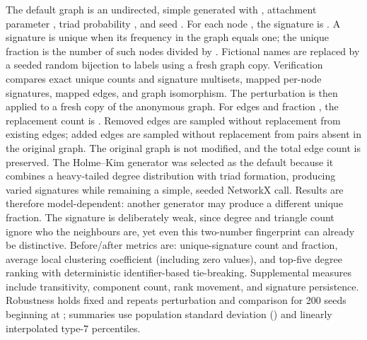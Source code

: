 {}
\markdownRendererSectionEnd \markdownRendererSectionBegin
{}\markdownRendererInterblockSeparator
{}The default graph is an undirected, simple  generated with , attachment parameter , triad probability , and seed . For each node , the signature is . A signature is unique when its frequency in the graph equals one; the unique fraction is the number of such nodes divided by .\markdownRendererParagraphSeparator
{}Fictional names are replaced by a seeded random bijection to  labels using a fresh graph copy. Verification compares exact unique counts and signature multisets, mapped per-node signatures, mapped edges, and graph isomorphism. The perturbation is then applied to a fresh copy of the anonymous graph. For  edges and fraction , the replacement count is . Removed edges are sampled without replacement from existing edges; added edges are sampled without replacement from pairs absent in the original graph. The original graph is not modified, and the total edge count is preserved.\markdownRendererParagraphSeparator
{}The Holme–Kim generator was selected as the default because it combines a heavy-tailed degree distribution with triad formation, producing varied signatures while remaining a simple, seeded NetworkX call. Results are therefore model-dependent: another generator may produce a different unique fraction. The signature is deliberately weak, since degree and triangle count ignore who the neighbours are, yet even this two-number fingerprint can already be distinctive.\markdownRendererParagraphSeparator
{}Before/after metrics are: unique-signature count and fraction, average local clustering coefficient (including zero values), and top-five degree ranking with deterministic identifier-based tie-breaking. Supplemental measures include transitivity, component count, rank movement, and signature persistence. Robustness holds  fixed and repeats perturbation and comparison for 200 seeds beginning at ; summaries use population standard deviation () and linearly interpolated type-7 percentiles.\markdownRendererInterblockSeparator
